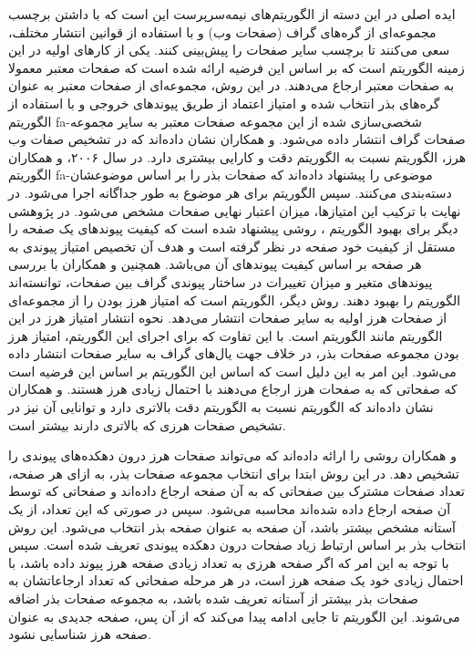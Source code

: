 \documentclass[twoside, a4paper,11pt]{book}
\numberwithin{equation}{chapter}
\numberwithin{table}{chapter}
\numberwithin{figure}{chapter}
\numberwithin{equation}{chapter}
\newcommand{\mls}[1]{\gls{fa-#1}\glsuseri{la-#1}}
\begin{document}
ایده اصلی در این دسته از الگوریتم‌های نیمه‌سرپرست این است که با داشتن برچسب مجموعه‌ای از گره‌های گراف (صفحات وب) و با استفاده از قوانین انتشار مختلف، سعی می‌کنند تا برچسب سایر صفحات را پیش‌بینی کنند. یکی از کارهای اولیه در این زمینه الگوریتم  \cite{gyongyi2004combating} است که بر اساس این فرضیه ارائه شده است که صفحات معتبر معمولا به صفحات معتبر ارجاع می‌دهند. در این روش، مجموعه‌ای از صفحات معتبر به عنوان گره‌های بذر انتخاب شده و امتیاز اعتماد از طریق پیوندهای خروجی و با استفاده از الگوریتم  \mls{شخصی‌سازی شده} از این مجموعه صفحات معتبر به سایر مجموعه صفحات گراف انتشار داده می‌شود.  و همکاران \cite{gyongyi2004combating} نشان داده‌اند که در تشخیص صفات وب هرز، الگوریتم  نسبت به الگوریتم  دقت و کارایی بیشتری دارد. در سال ۲۰۰۶،  و همکاران \cite{wu2006topical} الگوریتم  \mls{موضوعی} را پیشنهاد داده‌اند که صفحات بذر را بر اساس موضوعشان دسته‌بندی می‌کنند. سپس الگوریتم  برای هر موضوع به طور جداگانه اجرا می‌شود. در نهایت با ترکیب این امتیاز‌ها، میزان اعتبار نهایی صفحات  مشخص می‌شود. در پژوهشی دیگر \cite{caverlee2007countering} برای بهبود الگوریتم ، روشی پیشنهاد شده است که کیفیت پیوندهای یک صفحه را مستقل از کیفیت خود صفحه در نظر گرفته است و هدف آن تخصیص امتیاز پیوندی به هر صفحه بر اساس کیفیت پیوندهای آن می‌باشد. همچنین  و همکاران \cite{chen2008link} با بررسی پیوندهای متغیر و میزان تغییرات در ساختار پیوندی گراف بین صفحات، توانسته‌اند الگوریتم  را بهبود دهند. روش دیگر، الگوریتم   \cite{krishnan2006web} است که امتیاز هرز بودن را از مجموعه‌ای از صفحات هرز اولیه به سایر صفحات انتشار می‌دهد. نحوه انتشار امتیاز هرز در این الگوریتم مانند الگوریتم  است. با این تفاوت که برای اجرای این الگوریتم، امتیاز هرز بودن مجموعه صفحات بذر، در خلاف جهت یال‌های گراف به سایر صفحات انتشار داده می‌شود. این امر به این دلیل است که اساس این الگوریتم بر اساس این فرضیه است که صفحاتی که به صفحات هرز ارجاع می‌دهند با احتمال زیادی هرز هستند.  و همکاران \cite{krishnan2006web} نشان داده‌اند که الگوریتم  نسبت به الگوریتم  دقت بالاتری دارد و توانایی آن نیز در تشخیص صفحات هرزی که  بالاتری دارند بیشتر است.
 
   و همکاران \cite{wu2005identifying} روشی را ارائه داده‌اند که می‌تواند صفحات هرز درون دهکده‌های پیوندی را تشخیص دهد. در این روش ابتدا برای انتخاب مجموعه صفحات بذر، به ازای هر صفحه، تعداد صفحات مشترک بین صفحاتی که به آن صفحه ارجاع داده‌اند و صفحاتی که توسط آن صفحه ارجاع داده شده‌اند محاسبه می‌شود. سپس  در صورتی ‌که این تعداد، از یک آستانه مشخص بیشتر باشد، آن صفحه به عنوان صفحه بذر انتخاب می‌شود. این روش انتخاب بذر بر اساس ارتباط زیاد صفحات درون دهکده پیوندی تعریف شده است. سپس با توجه به این امر که اگر صفحه هرزی به تعداد زیادی صفحه هرز پیوند داده باشد، با احتمال زیادی خود یک صفحه هرز است، در هر مرحله صفحاتی  که تعداد ارجاعاتشان به صفحات بذر بیشتر از آستانه تعریف شده باشد، به مجموعه صفحات بذر اضافه می‌شوند. این الگوریتم تا جایی ادامه پیدا می‌کند که از آن پس، صفحه جدیدی به عنوان صفحه هرز شناسایی نشود. 
\end{document}
